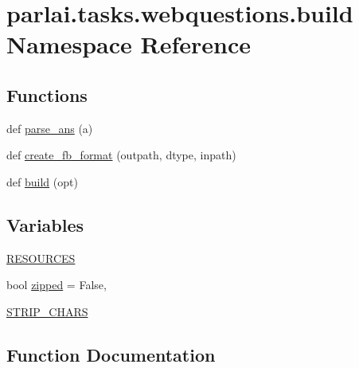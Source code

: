 \hypertarget{namespaceparlai_1_1tasks_1_1webquestions_1_1build}{}\section{parlai.\+tasks.\+webquestions.\+build Namespace Reference}
\label{namespaceparlai_1_1tasks_1_1webquestions_1_1build}
\subsection*{Functions}
\begin{DoxyCompactItemize}
\item 
def \hyperlink{namespaceparlai_1_1tasks_1_1webquestions_1_1build_a969c68eeef096e477def172c88928eb3}{parse\+\_\+ans} (a)
\item 
def \hyperlink{namespaceparlai_1_1tasks_1_1webquestions_1_1build_aba751402cc3a79acbe7517832498a7e6}{create\+\_\+fb\+\_\+format} (outpath, dtype, inpath)
\item 
def \hyperlink{namespaceparlai_1_1tasks_1_1webquestions_1_1build_a175826dcfcbe18189c4c668b1b335239}{build} (opt)
\end{DoxyCompactItemize}
\subsection*{Variables}
\begin{DoxyCompactItemize}
\item 
\hyperlink{namespaceparlai_1_1tasks_1_1webquestions_1_1build_ac4b3a91c9fccce1e8d32040a57332c07}{R\+E\+S\+O\+U\+R\+C\+ES}
\item 
bool \hyperlink{namespaceparlai_1_1tasks_1_1webquestions_1_1build_a138f163ba0904670971679aca3596827}{zipped} = False,
\item 
\hyperlink{namespaceparlai_1_1tasks_1_1webquestions_1_1build_a9f4c36987a516850b209c40be8b822ae}{S\+T\+R\+I\+P\+\_\+\+C\+H\+A\+RS}
\end{DoxyCompactItemize}


\subsection{Function Documentation}
\mbox{\label{namespaceparlai_1_1tasks_1_1webquestions_1_1build_a175826dcfcbe18189c4c668b1b335239}} 
